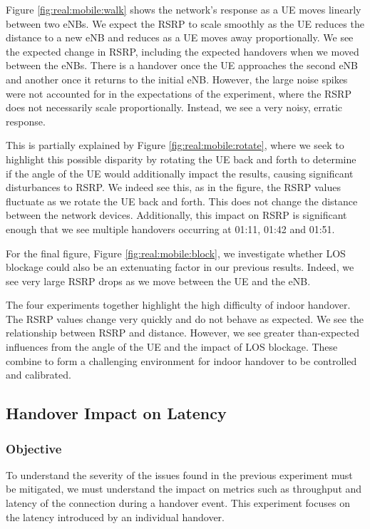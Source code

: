 Figure \ref{fig:real:mobile:walk} shows the network's response as a UE moves linearly between two eNBs. We expect the RSRP to scale smoothly as the UE reduces the distance to a new eNB and reduces as a UE moves away proportionally. We see the expected change in RSRP, including the expected handovers when we moved between the eNBs. There is a handover once the UE approaches the second eNB and another once it returns to the initial eNB. However, the large noise spikes were not accounted for in the expectations of the experiment, where the RSRP does not necessarily scale proportionally. Instead, we see a very noisy, erratic response. 

This is partially explained by Figure \ref{fig:real:mobile:rotate}, where we seek to highlight this possible disparity by rotating the UE back and forth to determine if the angle of the UE would additionally impact the results, causing significant disturbances to RSRP. We indeed see this, as in the figure, the RSRP values fluctuate as we rotate the UE back and forth. This does not change the distance between the network devices. Additionally, this impact on RSRP is significant enough that we see multiple handovers occurring at 01:11, 01:42 and 01:51. 

For the final figure, Figure \ref{fig:real:mobile:block}, we investigate whether LOS blockage could also be an extenuating factor in our previous results. Indeed, we see very large RSRP drops as we move between the UE and the eNB.

The four experiments together highlight the high difficulty of indoor handover. The RSRP values change very quickly and do not behave as expected. We see the relationship between RSRP and distance. However, we see greater than-expected influences from the angle of the UE and the impact of LOS blockage. These combine to form a challenging environment for indoor handover to be controlled and calibrated.

\subsection{Handover Impact on Latency}
\label{sec:handover-impact}
\subsubsection{Objective}
To understand the severity of the issues found in the previous experiment must be mitigated, we must understand the impact on metrics such as throughput and latency of the connection during a handover event. This experiment focuses on the latency introduced by an individual handover.

